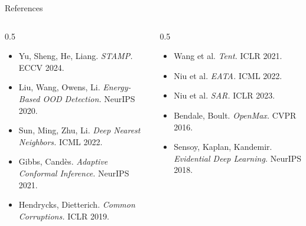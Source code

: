 \documentclass[aspectratio=169,10pt]{beamer}
\begin{document}
\begin{frame}{References}
  \scriptsize
  \begin{columns}[T]
    \begin{column}{0.5\textwidth}
      \\[1mm]
      \begin{itemize}
        \setlength\itemsep{1.6mm}
        \item Yu, Sheng, He, Liang. \textit{STAMP.} ECCV 2024.
        \item Liu, Wang, Owens, Li. \textit{Energy-Based OOD Detection.} NeurIPS 2020.
        \item Sun, Ming, Zhu, Li. \textit{Deep Nearest Neighbors.} ICML 2022.
        \item Gibbs, Cand\`es. \textit{Adaptive Conformal Inference.} NeurIPS 2021.
        \item Hendrycks, Dietterich. \textit{Common Corruptions.} ICLR 2019.
      \end{itemize}
    \end{column}
    \begin{column}{0.5\textwidth}
      \\[1mm]
      \begin{itemize}
        \setlength\itemsep{1.6mm}
        \item Wang et al. \textit{Tent.} ICLR 2021.
        \item Niu et al. \textit{EATA.} ICML 2022.
        \item Niu et al. \textit{SAR.} ICLR 2023.
        \item Bendale, Boult. \textit{OpenMax.} CVPR 2016.
        \item Sensoy, Kaplan, Kandemir. \textit{Evidential Deep Learning.} NeurIPS 2018.
      \end{itemize}
    \end{column}
  \end{columns}
\end{frame}

\begin{navyframe}
\end{navyframe}
\end{document}
